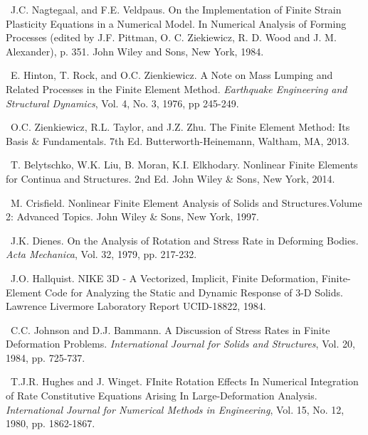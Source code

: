 \documentclass[11pt]{report}
\numberwithin{equation}{section}
\newcommand{\ti}{\emph}
\newcounter{sectrefs}
\begin{document}
\medskip
{}~J.C. Nagtegaal, and F.E. Veldpaus.
On the Implementation of Finite Strain Plasticity Equations in a Numerical Model.
In Numerical Analysis of Forming Processes (edited by J.F. Pittman, O. C. Ziekiewicz, R. D. Wood 
and J. M. Alexander), p. 351. John Wiley and Sons, New York, 1984.

\medskip
{}~E. Hinton, T. Rock, and O.C. Zienkiewicz.
A Note on Mass Lumping and Related Processes in the Finite Element Method. \ti{Earthquake Engineering and
Structural Dynamics}, Vol. 4, No. 3, 1976, pp 245-249.

\medskip
{}~O.C. Zienkiewicz, R.L. Taylor, 
and J.Z. Zhu. The Finite Element Method: Its Basis \& Fundamentals. 7th Ed. Butterworth-Heinemann, 
Waltham, MA, 2013.

\medskip
{}~T. Belytschko, W.K. Liu,
B. Moran, K.I. Elkhodary. Nonlinear Finite Elements for Continua and Structures. 2nd Ed. John Wiley \& Sons,
New York, 2014.

\medskip
{}~M. Crisfield. Nonlinear 
Finite Element Analysis 
of Solids and Structures.Volume 2: Advanced Topics. John Wiley \& Sons,
New York, 1997.

\medskip
{}~J.K. Dienes. On the Analysis of 
Rotation and Stress Rate in Deforming Bodies. \ti{Acta Mechanica}, Vol. 32, 1979, pp. 217-232.

\medskip
{}~J.O. Hallquist. NIKE 3D - A Vectorized, 
Implicit, Finite Deformation, Finite-Element Code for Analyzing the Static and 
Dynamic Response of 3-D Solids. Lawrence Livermore Laboratory Report UCID-18822, 1984.

\medskip
{}~C.C. Johnson and D.J. Bammann.
A Discussion of Stress Rates in Finite Deformation Problems. \ti{International Journal for Solids and Structures},
 Vol. 20, 1984, pp. 725-737.

\medskip
{}~T.J.R. Hughes and J. Winget.
FInite Rotation Effects In Numerical Integration of Rate Constitutive 
Equations Arising In Large-Deformation Analysis.
\ti{International Journal for Numerical Methods in Engineering},
 Vol. 15, No. 12, 1980, pp. 1862-1867.
 
\end{document}
